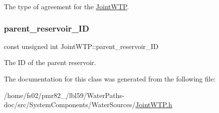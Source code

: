 The type of agreement for the \mbox{\hyperlink{classJointWTP}{Joint\+W\+TP}}. 

\mbox{\label{classJointWTP_aa5830cb4d3013a004b7168f4dbf475eb}} 
\subsubsection{\texorpdfstring{parent\+\_\+reservoir\+\_\+\+ID}{parent\_reservoir\_ID}}
{\footnotesize\ttfamily const unsigned int Joint\+W\+T\+P\+::parent\+\_\+reservoir\+\_\+\+ID}



The ID of the parent reservoir. 



The documentation for this class was generated from the following file\+:\begin{DoxyCompactItemize}
\item 
/home/fs02/pmr82\+\_/lbl59/\+Water\+Paths-\/doc/src/\+System\+Components/\+Water\+Sources/\mbox{\hyperlink{JointWTP_8h}{Joint\+W\+T\+P.\+h}}\end{DoxyCompactItemize}
